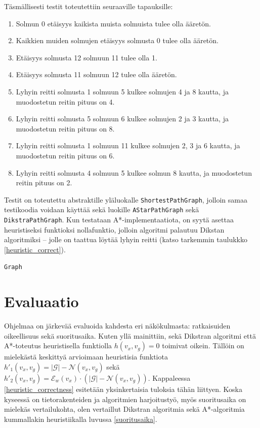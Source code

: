 \documentclass[10pt,a4paper]{article}
\begin{document}
Täsmällisesti testit toteutettiin seuraaville tapauksille:

\begin{enumerate}
\item Solmun 0 etäisyys kaikista muista solmuista tulee olla ääretön.
\item Kaikkien muiden solmujen etäisyys solmusta 0 tulee olla ääretön.
\item Etäisyys solmusta 12 solmuun 11 tulee olla 1.
\item Etäisyys solmusta 11 solmuun 12 tulee olla ääretön.
\item Lyhyin reitti solmusta 1 solmuun 5 kulkee solmujen 4 ja 8 kautta, ja muodostetun reitin pituus on 4.
\item Lyhyin reitti solmusta 5 solmuun 6 kulkee solmujen 2 ja 3 kautta, ja muodostetun reitin pituus on 8.
\item Lyhyin reitti solmusta 1 solmuun 11 kulkee solmujen 2, 3 ja 6 kautta, ja muodostetun reitin pituus on 6.
\item Lyhyin reitti solmusta 4 solmuun 5 kulkee solmun 8 kautta, ja muodostetun reitin pituus on 2.
\label{network_test}
\end{enumerate}

Testit on toteutettu abstraktille yläluokalle \texttt{ShortestPathGraph}, jolloin samaa testikoodia voidaan käyttää sekä luokille \texttt{AStarPathGraph} sekä \texttt{DikstraPathGraph}. Kun testataan A*-implementaatiota, on syytä asettaa heuristiseksi funktioksi nollafunktio, jolloin algoritmi palautuu Dikstan algoritmiksi -- jolle on taattua löytää lyhyin reitti (katso tarkemmin taulukkko \ref{heuristic_correct}).

\texttt{Graph}

\section{Evaluaatio}

Ohjelmaa on järkevää evaluoida kahdesta eri näkökulmasta: ratkaisuiden oikeellisuus sekä suoritusaika. Kuten yllä mainittiin, sekä Dikstran algoritmi että A*-toteutus heuristisella funktiolla $h(v_x,v_g) = 0$ toimivat oikein. Tällöin on mielekästä keskittyä arvioimaan heuristisia funktiota $h'_1( v_x, v_g ) = |\mathcal{G}| - \mathcal{N}( v_x , v_g )$ sekä $ h'_2( v_x, v_g ) = \mathcal{E}_w ( v_x ) \cdot ( |\mathcal{G}| - \mathcal{N}( v_x , v_g ) ) $. Kappaleessa \ref{heuristic_correctness} esitetään yksinkertaisia tuloksia tähän liittyen. Koska kyseessä on tietorakenteiden ja algoritmien harjoitustyö, myös suoritusaika on mielekäs vertailukohta, olen vertaillut Dikstran algoritmia sekä A*-algoritmia kummallakin heuristiikalla luvussa \ref{suoritusaika}.
\end{document}
